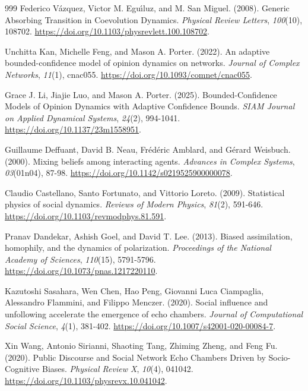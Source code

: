 \begin{thebibliography}{999}
Federico V\'{a}zquez, Victor M. Egu\'{\i}luz, and M. San Miguel. (2008). Generic Absorbing Transition in Coevolution Dynamics. \textit{Physical Review Letters}, \textit{100}(10), 108702. \url{https://doi.org/10.1103/physrevlett.100.108702}.

Unchitta Kan, Michelle Feng, and Mason A. Porter. (2022). An adaptive bounded-confidence model of opinion dynamics on networks. \textit{Journal of Complex Networks}, \textit{11}(1), cnac055. \url{https://doi.org/10.1093/comnet/cnac055}.

Grace J. Li, Jiajie Luo, and Mason A. Porter. (2025). Bounded-Confidence Models of Opinion Dynamics with Adaptive Confidence Bounds. \textit{SIAM Journal on Applied Dynamical Systems}, \textit{24}(2), 994-1041. \url{https://doi.org/10.1137/23m1558951}.

Guillaume Deffuant, David B. Neau, Fr\'{e}d\'{e}ric Amblard, and G\'{e}rard Weisbuch. (2000). Mixing beliefs among interacting agents. \textit{Advances in Complex Systems}, \textit{03}(01n04), 87-98. \url{https://doi.org/10.1142/s0219525900000078}.

Claudio Castellano, Santo Fortunato, and Vittorio Loreto. (2009). Statistical physics of social dynamics. \textit{Reviews of Modern Physics}, \textit{81}(2), 591-646. \url{https://doi.org/10.1103/revmodphys.81.591}.

Pranav Dandekar, Ashish Goel, and David T. Lee. (2013). Biased assimilation, homophily, and the dynamics of polarization. \textit{Proceedings of the National Academy of Sciences}, \textit{110}(15), 5791-5796. \url{https://doi.org/10.1073/pnas.1217220110}.

Kazutoshi Sasahara, Wen Chen, Hao Peng, Giovanni Luca Ciampaglia, Alessandro Flammini, and Filippo Menczer. (2020). Social influence and unfollowing accelerate the emergence of echo chambers. \textit{Journal of Computational Social Science}, \textit{4}(1), 381-402. \url{https://doi.org/10.1007/s42001-020-00084-7}.

Xin Wang, Antonio Sirianni, Shaoting Tang, Zhiming Zheng, and Feng Fu. (2020). Public Discourse and Social Network Echo Chambers Driven by Socio-Cognitive Biases. \textit{Physical Review X}, \textit{10}(4), 041042. \url{https://doi.org/10.1103/physrevx.10.041042}.


\end{thebibliography}
